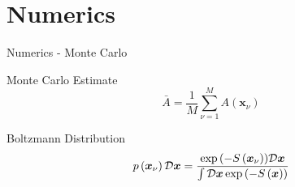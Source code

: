 \documentclass{beamer}
\begin{document}
\section{Numerics}
\begin{frame}{Numerics - Monte Carlo}
    {
        \begin{block}{Monte Carlo Estimate}
            \begin{equation}
                \bar{A} = \frac{1}{M}\sum^{M}_{\nu = 1} A\left(\bm{x}_{\nu}\right)
            \end{equation}
        \end{block}
    }
    {
        \begin{block}{Boltzmann Distribution}
            \begin{equation}
                p\left(\bm{x}_{\nu}\right){\cal D}\bm{x} = \frac{\exp{\left(-S\left(\bm{x}_{\nu}\right)\right)}{\cal D}\bm{x}}{\int {\cal D}\bm{x}\exp{\left(-S\left(\bm{x}\right)\right)}}
            \end{equation}
        \end{block}
    }
\end{frame}
\end{document}
